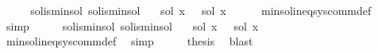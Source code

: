 \begin{isabellebody}
\isatagproof
{}\isamarkupfalse%
\ {\isacharminus}{\kern0pt}\isanewline
\ \ \isamarkupfalse%
\ sol{}{\isacharunderscore}{\kern0pt}is{\isacharunderscore}{\kern0pt}min{\isacharunderscore}{\kern0pt}sol\ sol{}{\isacharunderscore}{\kern0pt}is{\isacharunderscore}{\kern0pt}min{\isacharunderscore}{\kern0pt}sol\ \isamarkupfalse%
\ {\isachardoublequoteopen}{\isasymPsi}\ {\isacharparenleft}{\kern0pt}sol{}\ x{\isacharparenright}{\kern0pt}\ {\isasymsubseteq}\ {\isasymPsi}\ {\isacharparenleft}{\kern0pt}sol{}\ x{\isacharparenright}{\kern0pt}{\isachardoublequoteclose}\isanewline
\ \ \ \ \isamarkupfalse%
\ min{\isacharunderscore}{\kern0pt}sol{\isacharunderscore}{\kern0pt}ineq{\isacharunderscore}{\kern0pt}sys{\isacharunderscore}{\kern0pt}comm{\isacharunderscore}{\kern0pt}def\ \isamarkupfalse%
\ simp\isanewline
\ \ \isamarkupfalse%
\ \isamarkupfalse%
\ sol{}{\isacharunderscore}{\kern0pt}is{\isacharunderscore}{\kern0pt}min{\isacharunderscore}{\kern0pt}sol\ sol{}{\isacharunderscore}{\kern0pt}is{\isacharunderscore}{\kern0pt}min{\isacharunderscore}{\kern0pt}sol\ \isamarkupfalse%
\ {\isachardoublequoteopen}{\isasymPsi}\ {\isacharparenleft}{\kern0pt}sol{}\ x{\isacharparenright}{\kern0pt}\ {\isasymsubseteq}\ {\isasymPsi}\ {\isacharparenleft}{\kern0pt}sol{}\ x{\isacharparenright}{\kern0pt}{\isachardoublequoteclose}\isanewline
\ \ \ \ \isamarkupfalse%
\ min{\isacharunderscore}{\kern0pt}sol{\isacharunderscore}{\kern0pt}ineq{\isacharunderscore}{\kern0pt}sys{\isacharunderscore}{\kern0pt}comm{\isacharunderscore}{\kern0pt}def\ \isamarkupfalse%
\ simp\isanewline
\ \ \isamarkupfalse%
\ \isamarkupfalse%
\ {\isacharquery}{\kern0pt}thesis\ \isamarkupfalse%
\ blast\isanewline
{}\isamarkupfalse%
%
\endisatagproof
{\isafoldproof}%
%
\isadelimproof
\isanewline
%
\endisadelimproof
%
\isadelimtheory
\isanewline
%
\endisadelimtheory
%
\isatagtheory
{}\isamarkupfalse%
%
\endisatagtheory
{\isafoldtheory}%
%
\isadelimtheory
%
\endisadelimtheory
%
\end{isabellebody}%
\endinput
